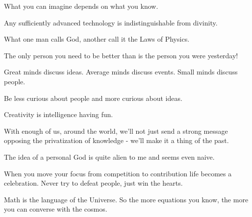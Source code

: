  	 \begin{fquote}What you can imagine depends on what you know.
 	\end{fquote}
 	
 	\begin{fquote}Any sufficiently advanced technology is indistinguishable from divinity.
 	\end{fquote}
 	
 	\begin{fquote}What one man calls God, another call it the Laws of Physics.
 	\end{fquote}
 	
 	\begin{fquote}The only person you need to be better than is the person you were yesterday!
 	\end{fquote}
 	
 	\begin{fquote}Great minds discuss ideas. Average minds discuss events. Small minds discuss people.
 	\end{fquote}
 	
 	\begin{fquote}Be less curious about people and more curious about ideas.
 	\end{fquote}
 	
 	\begin{fquote}Creativity is intelligence having fun.
 	\end{fquote}
 	
 	\begin{fquote}With enough of us, around the world, we'll not just send a strong message opposing the privatization of knowledge - we'll make it a thing of the past.
 	\end{fquote}
 	
 	\begin{fquote}The idea of a personal God is quite alien to me and seems even naive.
 	\end{fquote}
 	
 	\begin{fquote}[Buddha]When you move your focus from competition to contribution life becomes a celebration. Never try to defeat people, just win the hearts.
 	\end{fquote}
 	
 	\begin{fquote}Math is the language of the Universe. So the more equations you know, the more you can converse with the cosmos.
 	\end{fquote}
 	
